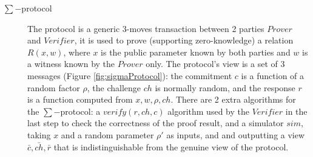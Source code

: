 \begin{description}
\item[$\sum-$protocol] The protocol is a generic 3-moves transaction between 2 parties
  \(Prover\) and \(Verifier\), it is used to prove (supporting zero-knowledge) a
  relation \(R(x,w)\), where \(x\) is the public parameter known by both
  parties and \(w\) is a witness known by the \(Prover\) only. The protocol's
  view is a set of 3 messages (Figure \ref{fig:sigmaProtocol}): the commitment
  \(c\) is a function of a random factor \(\rho\), the challenge \(ch\) is
  normally random, and the response \(r\) is a function computed from
  \(x, w, \rho, ch\). There are 2 extra algorithms for the \(\sum-\)protocol: a
  \(verify(r,ch,c)\) algorithm used by the \(Verifier\) in the last step to
  check the correctness of the proof result, and a simulator \(sim\), taking
  \(x\) and a random parameter \(\rho'\) as inputs, and and outputting a view
  \(\bar{c},\bar{ch},\bar{r}\) that is indistinguishable from the genuine view
  of the protocol.


\end{description}
